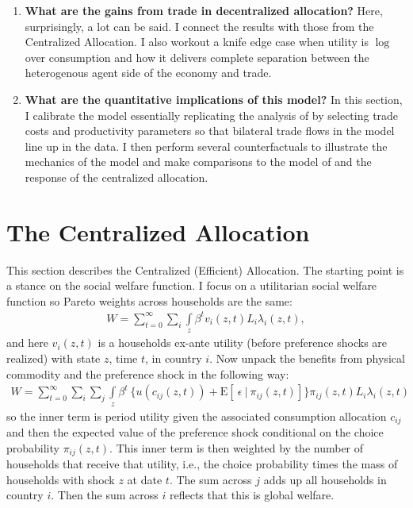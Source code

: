 \documentclass[12pt,pdftex]{article}
\begin{document}
\begin{onehalfspacing}
\begin{enumerate}
\item \textbf{What are the gains from trade in decentralized allocation?} Here, surprisingly, a lot can be said. I connect the results with those from the Centralized Allocation. I also workout a knife edge case when utility is $\log$ over consumption and how it delivers complete separation between the heterogenous agent side of the economy and trade.

\item \textbf{What are the quantitative implications of this model?} In this section, I calibrate the model essentially replicating the analysis of \citet{eaton2002technology} by selecting trade costs and productivity parameters so that bilateral trade flows in the model line up in the data. I then perform several counterfactuals to illustrate the mechanics of the model and make comparisons to the model of \citet{eaton2002technology} and the response of the centralized allocation.
\end{enumerate}

\section{The Centralized Allocation}

This section describes the Centralized (Efficient) Allocation. The starting point is a stance on the social welfare function. I focus on a utilitarian social welfare function so Pareto weights across households are the same:
\begin{align}
W = \sum_{t=0}^{\infty} \sum_{i} \int\limits_{z} \beta^{t} v_{i}(z,t) L_{i}\lambda_{i}(z,t),
\nonumber
\end{align}
and here $v_i(z,t)$ is a households ex-ante utility (before preference shocks are realized) with state $z$, time $t$, in country $i$. Now unpack the benefits from physical commodity and the preference shock in the following way:
\begin{align}
W = \sum_{t=0}^{\infty}  \sum_{i} \sum_{j} \int\limits_{z}  \beta^{t} \  \bigg \{  u(c_{ij}(z, t) ) + \mathrm{E}[ \ \epsilon \ | \ \pi_{ij}(z,t) ] \bigg \}\pi_{ij}(z,t) L_{i} \lambda_{i}(z, t)
\label{eq:social-welfare-2}
\end{align}
so the inner term is period utility given the associated consumption allocation $c_{ij}$ and then the expected value of the preference shock conditional on the choice probability $\pi_{ij}(z,t)$. This inner term is then weighted by the number of households that receive that utility, i.e., the choice probability times the mass of households with shock $z$ at date $t$. The sum across $j$ adds up all households in country $i$. Then the sum across $i$ reflects that this is global welfare.


\end{onehalfspacing}
\end{document}
